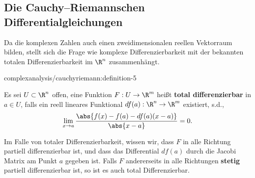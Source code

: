 \documentclass[letterpaper,10pt,german]{jupyterBook}
\begin{document}
\subsection{Die Cauchy–Riemannschen Differentialgleichungen}
\label{\detokenize{complexanalysis/cauchyriemann:die-cauchy-riemannschen-differentialgleichungen}}
\par
Da die komplexen Zahlen auch einen zweidimensionalen reellen Vektorraum bilden, stellt sich die Frage wie komplexe Differenzierbarkeit mit der bekannten totalen Differenzierbarkeit im \(\R^n\) zusammenhängt.
\begin{definition}{}{complexanalysis/cauchyriemann:definition-5}



\par
Es sei \(U\subset\R^n\) offen, eine Funktion \(F:U\to\R^m\) heißt \textbf{total differenzierbar} in \(a\in U\), falls ein reell lineares Funktional \(df(a):\R^n\to\R^m\) existiert, s.d.,
\begin{align*}
\lim_{x\to a} \frac{\abs{f(x)-f(a) - df(a)(x-a)}}{\abs{x-a}} = 0.
\end{align*}\end{definition}

\par
Im Falle von totaler Differenzierbarkeit, wissen wir, dass \(F\) in alle Richtung partiell differenzierbar ist, und dass das Differential \(df(a)\) durch die Jacobi Matrix am Punkt \(a\) gegeben ist. Falls \(F\) andererseits in alle Richtungen \textbf{stetig} partiell differenzierbar ist, so ist es auch total Differenzierbar.
\end{document}
